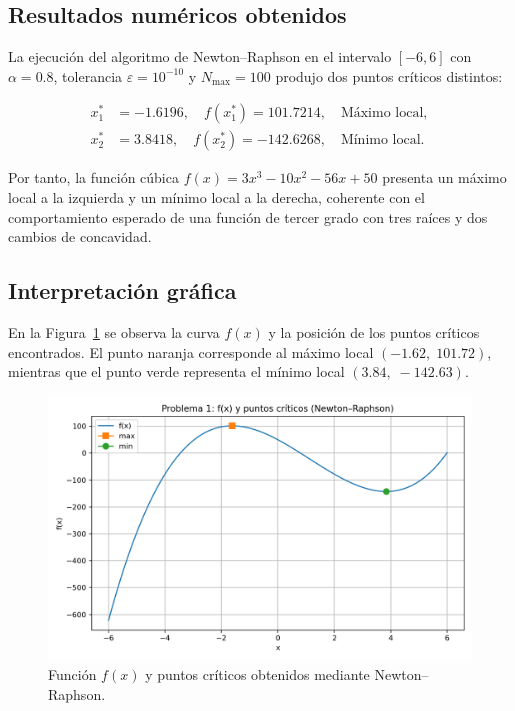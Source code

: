 \documentclass{article}
\begin{document}
\subsection{Resultados numéricos obtenidos}

La ejecución del algoritmo de Newton--Raphson en el intervalo \([-6,6]\) con
\(\alpha = 0.8\), tolerancia \(\varepsilon = 10^{-10}\) y \(N_{\text{max}}=100\)
produjo dos puntos críticos distintos:

\[
\begin{aligned}
x_1^* &= -1.6196, \quad f(x_1^*) = 101.7214, \quad \text{Máximo local},\\[4pt]
x_2^* &= 3.8418, \quad f(x_2^*) = -142.6268, \quad \text{Mínimo local.}
\end{aligned}
\]

Por tanto, la función cúbica \(f(x)=3x^3-10x^2-56x+50\)
presenta un máximo local a la izquierda y un mínimo local a la derecha, coherente
con el comportamiento esperado de una función de tercer grado con tres raíces
y dos cambios de concavidad.

\subsection{Interpretación gráfica}

En la Figura~\ref{fig:extremos} se observa la curva \(f(x)\) y la posición de los
puntos críticos encontrados.  
El punto naranja corresponde al máximo local \((-1.62,\;101.72)\),
mientras que el punto verde representa el mínimo local \((3.84,\;-142.63)\).

\begin{figure}[H]
    \centering
    \includegraphics[width=0.8\linewidth]{problema1_funcion_extremos.png}
    \caption{Función \(f(x)\) y puntos críticos obtenidos mediante Newton--Raphson.}
    \label{fig:extremos}
\end{figure}
\end{document}
